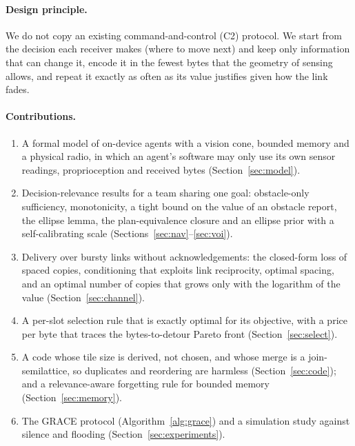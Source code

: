 \documentclass[11pt,a4paper]{article}
\theoremstyle{definition}
\begin{document}
\paragraph{Design principle.} We do not copy an existing command-and-control (C2) protocol. We start from the decision each receiver makes (where to move next) and keep only information that can change it, encode it in the fewest bytes that the geometry of sensing allows, and repeat it exactly as often as its value justifies given how the link fades.

\paragraph{Contributions.}
\begin{enumerate}
\item A formal model of on-device agents with a vision cone, bounded memory and a physical radio, in which an agent's software may only use its own sensor readings, proprioception and received bytes (Section~\ref{sec:model}).
\item Decision-relevance results for a team sharing one goal: obstacle-only sufficiency, monotonicity, a tight bound on the value of an obstacle report, the ellipse lemma, the plan-equivalence closure and an ellipse prior with a self-calibrating scale (Sections~\ref{sec:nav}--\ref{sec:voi}).
\item Delivery over bursty links without acknowledgements: the closed-form loss of spaced copies, conditioning that exploits link reciprocity, optimal spacing, and an optimal number of copies that grows only with the logarithm of the value (Section~\ref{sec:channel}).
\item A per-slot selection rule that is exactly optimal for its objective, with a price per byte that traces the bytes-to-detour Pareto front (Section~\ref{sec:select}).
\item A code whose tile size is derived, not chosen, and whose merge is a join-semilattice, so duplicates and reordering are harmless (Section~\ref{sec:code}); and a relevance-aware forgetting rule for bounded memory (Section~\ref{sec:memory}).
\item The GRACE protocol (Algorithm~\ref{alg:grace}) and a simulation study against silence and flooding (Section~\ref{sec:experiments}).
\end{enumerate}
\end{document}
